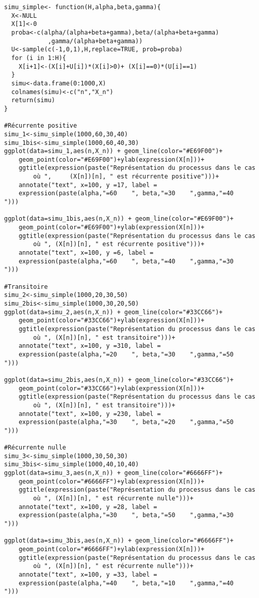 \documentclass[12pt,a4paper]{report}
\theoremstyle{remark}
\begin{document}
\begin{lstlisting}
simu_simple<- function(H,alpha,beta,gamma){
  X<-NULL
  X[1]<-0
  proba<-c(alpha/(alpha+beta+gamma),beta/(alpha+beta+gamma)
            ,gamma/(alpha+beta+gamma))
  U<-sample(c(-1,0,1),H,replace=TRUE, prob=proba)
  for (i in 1:H){
    X[i+1]<-(X[i]+U[i])*(X[i]>0)+ (X[i]==0)*(U[i]==1)
  }
  simu<-data.frame(0:1000,X)
  colnames(simu)<-c("n","X_n")
  return(simu)
}

#Récurrente positive
simu_1<-simu_simple(1000,60,30,40)
simu_1bis<-simu_simple(1000,60,40,30)
ggplot(data=simu_1,aes(n,X_n)) + geom_line(color="#E69F00")+
    geom_point(color="#E69F00")+ylab(expression(X[n]))+
    ggtitle(expression(paste("Représentation du processus dans le cas
        où ",     (X[n])[n], " est récurrente positive")))+
    annotate("text", x=100, y =17, label =
    expression(paste(alpha,"=60    ", beta,"=30    ",gamma,"=40    ")))

ggplot(data=simu_1bis,aes(n,X_n)) + geom_line(color="#E69F00")+
    geom_point(color="#E69F00")+ylab(expression(X[n]))+
    ggtitle(expression(paste("Représentation du processus dans le cas
        où ", (X[n])[n], " est récurrente positive")))+
    annotate("text", x=100, y =6, label =
    expression(paste(alpha,"=60    ", beta,"=40    ",gamma,"=30    ")))

#Transitoire
simu_2<-simu_simple(1000,20,30,50)
simu_2bis<-simu_simple(1000,30,20,50)
ggplot(data=simu_2,aes(n,X_n)) + geom_line(color="#33CC66")+
    geom_point(color="#33CC66")+ylab(expression(X[n]))+
    ggtitle(expression(paste("Représentation du processus dans le cas
        où ", (X[n])[n], " est transitoire")))+
    annotate("text", x=100, y =310, label =
    expression(paste(alpha,"=20    ", beta,"=30    ",gamma,"=50    ")))
    
ggplot(data=simu_2bis,aes(n,X_n)) + geom_line(color="#33CC66")+
    geom_point(color="#33CC66")+ylab(expression(X[n]))+
    ggtitle(expression(paste("Représentation du processus dans le cas
        où ", (X[n])[n], " est transitoire")))+
    annotate("text", x=100, y =230, label =
    expression(paste(alpha,"=30    ", beta,"=20    ",gamma,"=50    ")))

#Récurrente nulle
simu_3<-simu_simple(1000,30,50,30)
simu_3bis<-simu_simple(1000,40,10,40)
ggplot(data=simu_3,aes(n,X_n)) + geom_line(color="#6666FF")+
    geom_point(color="#6666FF")+ylab(expression(X[n]))+
    ggtitle(expression(paste("Représentation du processus dans le cas
        où ", (X[n])[n], " est récurrente nulle")))+
    annotate("text", x=100, y =28, label =
    expression(paste(alpha,"=30    ", beta,"=50    ",gamma,"=30    ")))

ggplot(data=simu_3bis,aes(n,X_n)) + geom_line(color="#6666FF")+
    geom_point(color="#6666FF")+ylab(expression(X[n]))+
    ggtitle(expression(paste("Représentation du processus dans le cas
        où ", (X[n])[n], " est récurrente nulle")))+
    annotate("text", x=100, y =33, label =
    expression(paste(alpha,"=40    ", beta,"=10    ",gamma,"=40    ")))
\end{lstlisting}
\end{document}
